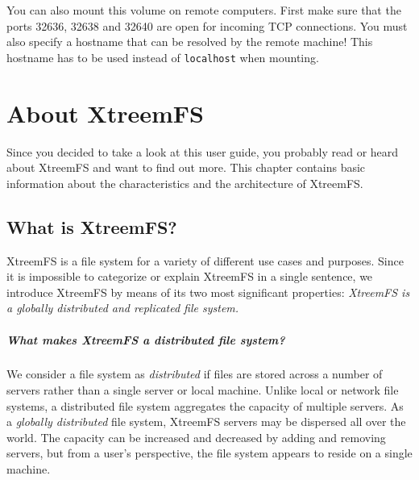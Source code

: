 \documentclass[a4paper,10pt]{book}
\begin{document}
You can also mount this volume on remote computers. First make sure that the ports 32636, 32638 and 32640 are open for incoming TCP connections. You must also specify a hostname that can be resolved by the remote machine! This hostname has to be used instead of \texttt{localhost} when mounting.

\chapter{About XtreemFS}
\setcounter{page}{1}

Since you decided to take a look at this user guide, you probably read or heard about XtreemFS and want to find out more. This chapter contains basic information about the characteristics and the architecture of XtreemFS.

\section{What is XtreemFS?}
XtreemFS is a file system for a variety of different use cases and purposes. Since it is impossible to categorize or explain XtreemFS in a single sentence, we introduce XtreemFS by means of its two most significant properties: \emph{XtreemFS is a globally distributed and replicated file system.}

\paragraph{What makes XtreemFS a distributed file system?} We consider a file system as \emph{distributed} if files are stored across a number of servers rather than a single server or local machine. Unlike local or network file systems, a distributed file system aggregates the capacity of multiple servers. As a \emph{globally distributed} file system, XtreemFS servers may be dispersed all over the world. The capacity can be increased and decreased by adding and removing servers, but from a user's perspective, the file system appears to reside on a single machine.
\end{document}
